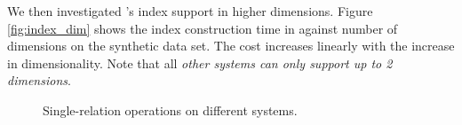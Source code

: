 We then investigated \name's index support in higher
dimensions. Figure \ref{fig:index_dim} shows the index construction
time in \name against number of dimensions on the synthetic data
set. The cost increases linearly with the increase in
dimensionality. Note that all {\em other systems can only support up
  to 2 dimensions}.






\begin{figure}[!t]
      \caption{Single-relation operations on different
        systems.}
	\label{fig:system_single}\vspace{-4mm}
\end{figure}

